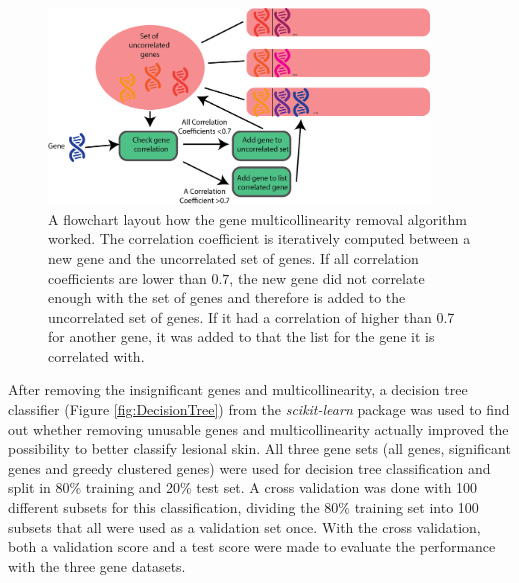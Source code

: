 \documentclass[10pt,a4paper]{report}
\begin{document}
	\begin{figure}[H]
		\includegraphics[width=0.9\textwidth]{GreedyClustering.png}
		\caption{A flowchart layout how the gene multicollinearity removal algorithm worked. The correlation coefficient is iteratively computed between a new gene and the uncorrelated set of genes. If all correlation coefficients are lower than $0.7$, the new gene did not correlate enough with the set of genes and therefore is added to the uncorrelated set of genes. If it had a correlation of higher than 0.7 for another gene, it was added to that the list for the gene it is correlated with.}
		\label{fig:GreedyCorrelationClustering}
	\end{figure}
	
	After removing the insignificant genes and multicollinearity, a decision tree classifier (Figure \ref{fig:DecisionTree}) from the \textit{scikit-learn} package was used to find out whether removing unusable genes and multicollinearity actually improved the possibility to better classify lesional skin. All three gene sets (all genes, significant genes and greedy clustered genes) were used for decision tree classification and split in 80\% training and 20\% test set. A cross validation was done with 100 different subsets for this classification, dividing the 80\% training set into 100 subsets that all were used as a validation set once. With the cross validation, both a validation score and a test score were made to evaluate the performance with the three gene datasets.
	
\end{document}
